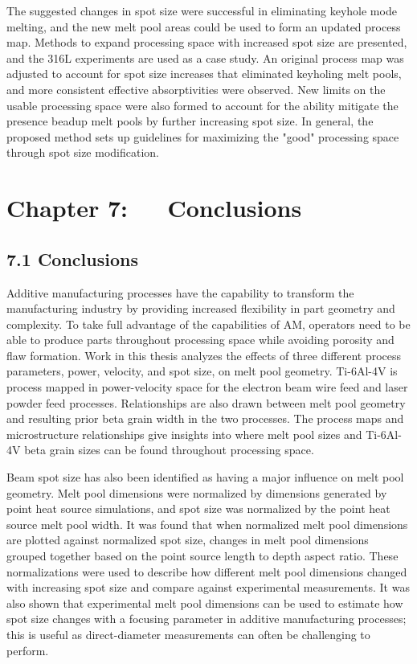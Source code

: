 \documentclass[10pt]{article}
\begin{document}
The suggested changes in spot size were successful in eliminating keyhole mode melting, and the new melt pool areas could be used to form an updated process map. Methods to expand processing space with increased spot size are presented, and the 316L experiments are used as a case study. An original process map was adjusted to account for spot size increases that eliminated keyholing melt pools, and more consistent effective absorptivities were observed. New limits on the usable processing space were also formed to account for the ability mitigate the presence beadup melt pools by further increasing spot size. In general, the proposed method sets up guidelines for maximizing the "good" processing space through spot size modification.

\section*{Chapter 7: $\quad$ Conclusions}
\subsection*{7.1 Conclusions}
Additive manufacturing processes have the capability to transform the manufacturing industry by providing increased flexibility in part geometry and complexity. To take full advantage of the capabilities of AM, operators need to be able to produce parts throughout processing space while avoiding porosity and flaw formation. Work in this thesis analyzes the effects of three different process parameters, power, velocity, and spot size, on melt pool geometry. Ti-6Al-4V is process mapped in power-velocity space for the electron beam wire feed and laser powder feed processes. Relationships are also drawn between melt pool geometry and resulting prior beta grain width in the two processes. The process maps and microstructure relationships give insights into where melt pool sizes and Ti-6Al-4V beta grain sizes can be found throughout processing space.

Beam spot size has also been identified as having a major influence on melt pool geometry. Melt pool dimensions were normalized by dimensions generated by point heat source simulations, and spot size was normalized by the point heat source melt pool width. It was found that when normalized melt pool dimensions are plotted against normalized spot size, changes in melt pool dimensions grouped together based on the point source length to depth aspect ratio. These normalizations were used to describe how different melt pool dimensions changed with increasing spot size and compare against experimental measurements. It was also shown that experimental melt pool dimensions can be used to estimate how spot size changes with a focusing parameter in additive manufacturing processes; this is useful as direct-diameter measurements can often be challenging to perform.
\end{document}
